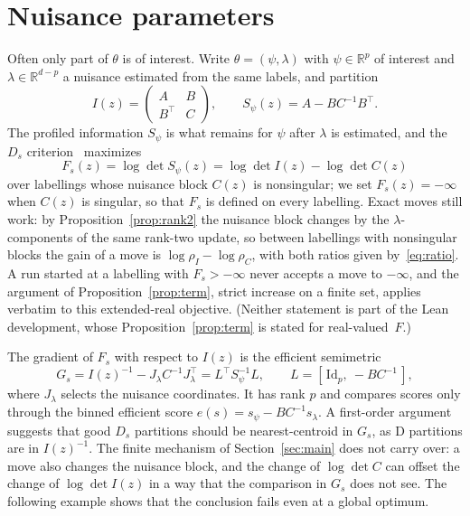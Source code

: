 \documentclass[11pt]{amsart}
\theoremstyle{definition}
\theoremstyle{remark}
\newcommand{\R}{\mathbb{R}}
\newcommand{\T}{^{\top}}
\newcommand{\Ib}{I(z)}
\begin{document}
\section{Nuisance parameters}\label{sec:nuisance}

Often only part of $\theta$ is of interest. Write $\theta=(\psi,\lambda)$ with
$\psi\in\R^p$ of interest and $\lambda\in\R^{d-p}$ a nuisance estimated from the same labels, and
partition
\[
\Ib=\begin{pmatrix}A&B\\B\T&C\end{pmatrix},\qquad
S_\psi(z)=A-BC^{-1}B\T .
\]
The profiled information $S_\psi$ is what remains for $\psi$ after $\lambda$ is estimated, and
the $D_s$ criterion~\cite{karlin1966} maximizes
\[
F_s(z)=\log\det S_\psi(z)=\log\det\Ib-\log\det C(z)
\]
over labellings whose nuisance block $C(z)$ is nonsingular; we set $F_s(z)=-\infty$ when $C(z)$
is singular, so that $F_s$ is defined on every labelling. Exact moves still work: by
Proposition~\ref{prop:rank2} the nuisance block changes by the $\lambda$-components of the same
rank-two update, so between labellings with nonsingular blocks the gain of a move is
$\log\rho_I-\log\rho_C$, with both ratios given by~\eqref{eq:ratio}. A run started at a
labelling with $F_s>-\infty$ never accepts a move to $-\infty$, and the argument of
Proposition~\ref{prop:term}, strict increase on a finite set, applies verbatim to this
extended-real objective. (Neither statement is part of the Lean development, whose
Proposition~\ref{prop:term} is stated for real-valued~$F$.)

The gradient of $F_s$ with respect to $\Ib$ is the efficient semimetric
\[
G_s=\Ib^{-1}-J_\lambda C^{-1}J_\lambda\T=L\T S_\psi^{-1}L,\qquad L=[\,\mathrm{Id}_p,\ -BC^{-1}\,],
\]
where $J_\lambda$ selects the nuisance coordinates. It has rank $p$ and compares scores only
through the binned efficient score $e(s)=s_\psi-BC^{-1}s_\lambda$. A first-order argument
suggests that good $D_s$ partitions should be nearest-centroid in $G_s$, as D partitions are in
$\Ib^{-1}$. The finite mechanism of Section~\ref{sec:main} does not carry over: a move also
changes the nuisance block, and the change of $\log\det C$ can offset the change of
$\log\det\Ib$ in a way that the comparison in $G_s$ does not see.
The following example shows that the conclusion fails even at a global optimum.
\end{document}

